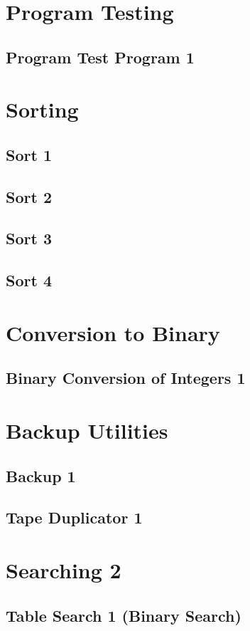 \documentclass{article}
\begin{document}
\begin{enumerate}
\section{Program Testing}
\subsection{Program Test Program 1}
\section{Sorting}
\subsection{Sort 1}
\subsection{Sort 2}
\subsection{Sort 3}
\subsection{Sort 4}
\section{Conversion to Binary}
\subsection{Binary Conversion of Integers 1}
\section{Backup Utilities}
\subsection{Backup 1}
\subsection{Tape Duplicator 1}
\section{Searching 2}
\subsection{Table Search 1 (Binary Search)}

\end{enumerate}
\end{document}
